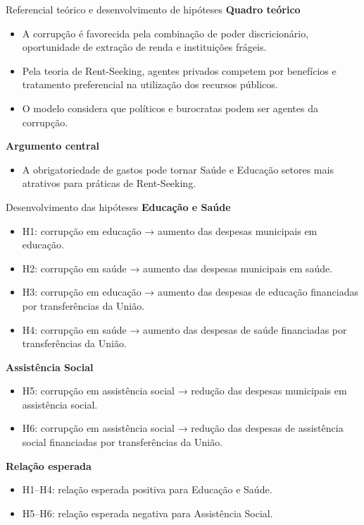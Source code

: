 \documentclass[
  10pt,
  ignorenonframetext,
  aspectratio=169,
  brazilian,
]{beamer}
\providecommand{\tightlist}{%
  \setlength{\itemsep}{0pt}\setlength{\parskip}{0pt}}
\begin{document}
\begin{frame}{Referencial teórico e desenvolvimento de hipóteses}
\protect{}\label{referencial-teuxf3rico-e-desenvolvimento-de-hipuxf3teses}
\textbf{Quadro teórico}

\begin{itemize}
\tightlist
\item
  A corrupção é favorecida pela combinação de poder discricionário,
  oportunidade de extração de renda e instituições frágeis.
\item
  Pela teoria de Rent-Seeking, agentes privados competem por benefícios
  e tratamento preferencial na utilização dos recursos públicos.
\item
  O modelo considera que políticos e burocratas podem ser agentes da
  corrupção.
\end{itemize}

\textbf{Argumento central}

\begin{itemize}
\tightlist
\item
  A obrigatoriedade de gastos pode tornar Saúde e Educação setores mais
  atrativos para práticas de Rent-Seeking.
\end{itemize}
\end{frame}

\begin{frame}{Desenvolvimento das hipóteses}
\protect{}\label{desenvolvimento-das-hipuxf3teses}
\textbf{Educação e Saúde}

\begin{itemize}
\tightlist
\item
  H1: corrupção em educação → aumento das despesas municipais em
  educação.
\item
  H2: corrupção em saúde → aumento das despesas municipais em saúde.
\item
  H3: corrupção em educação → aumento das despesas de educação
  financiadas por transferências da União.
\item
  H4: corrupção em saúde → aumento das despesas de saúde financiadas por
  transferências da União.
\end{itemize}

\textbf{Assistência Social}

\begin{itemize}
\tightlist
\item
  H5: corrupção em assistência social → redução das despesas municipais
  em assistência social.
\item
  H6: corrupção em assistência social → redução das despesas de
  assistência social financiadas por transferências da União.
\end{itemize}

\textbf{Relação esperada}

\begin{itemize}
\tightlist
\item
  H1--H4: relação esperada positiva para Educação e Saúde.
\item
  H5--H6: relação esperada negativa para Assistência Social.
\end{itemize}
\end{frame}
\end{document}
